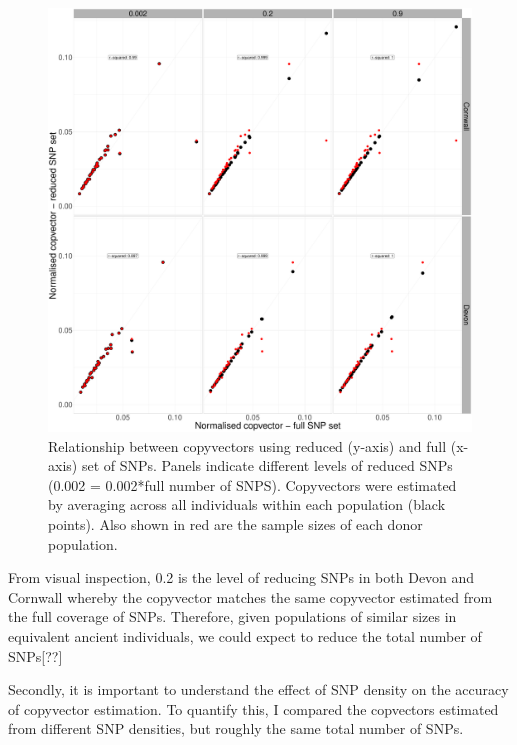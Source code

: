 \begin{figure}[htp]
    \centering
    \includegraphics[width=1.0\textwidth]{../images/chapter1/Devon_Cornwall_copyvectors_sample_size_reduced.pdf}
    \caption{Relationship between copyvectors using reduced (y-axis) and full (x-axis) set of SNPs. Panels indicate different levels of reduced SNPs (0.002 = 0.002*full number of SNPS). Copyvectors were estimated by averaging across all individuals within each population (black points). Also shown in red are the sample sizes of each donor population.}
    \label{fig:Devon_Cornwall_copyvectors_sample_size_reduced}
\end{figure}

From visual inspection, 0.2 is the level of reducing SNPs in both Devon and Cornwall whereby the copyvector matches the same copyvector estimated from the full coverage of SNPs. Therefore, given populations of similar sizes in equivalent ancient individuals, we could expect to reduce the total number of SNPs{\color{red}[??]}

Secondly, it is important to understand the effect of SNP density on the accuracy of copyvector estimation. To quantify this, I compared the copvectors estimated from different SNP densities, but roughly the same total number of SNPs. 

